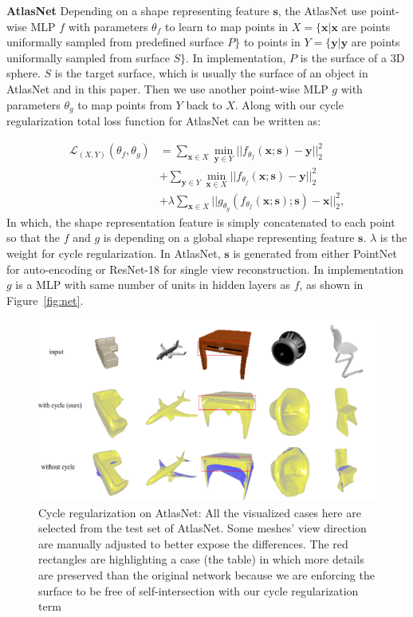 \noindent\textbf{AtlasNet} Depending on a shape representing feature $\mathbf{s}$, the AtlasNet use point-wise MLP
$f$ with parameters $\theta_f$ to learn to map points in $X=\{\mathbf{x}| \mathbf{x}$ are points uniformally sampled from predefined surface $P\}$ to points in $Y=\{\mathbf{y}| \mathbf{y}$ are points uniformally sampled from surface $S\}$. In implementation, $P$ is the surface of a 3D sphere. $S$ is the target surface, which is usually the surface of an object in AtlasNet\cite{atlasnet} and in this paper. Then we use another point-wise MLP $g$ with parameters $\theta_g$ to map points from $Y$ back to $X$. Along with our cycle regularization  total loss function for AtlasNet can be written as:

\begin{equation}
\begin{aligned}
\label{equ:atlascycle}
\mathcal{L}_{(X,Y)}(\theta_f,\theta_g) &= \sum_{\mathbf{x} \in X} \min_{\mathbf{y} \in Y}|| f_{\theta_f}(\mathbf{x};\mathbf{s}) - \mathbf{y} ||_2^2 \\ &+ \sum_{ \mathbf{y} \in Y}\min_{ \mathbf{x} \in X} || f_{\theta_f}(\mathbf{x};\mathbf{s}) - \mathbf{y} ||_2^2 \\ &+ \lambda\sum_{\mathbf{x} \in X}||g_{\theta_g}(f_{\theta_f}(\mathbf{x};\mathbf{s});\mathbf{s}) - \mathbf{x}||_2^2,
\end{aligned}
 \end{equation}
In which, the shape representation feature is simply concatenated to each point so that the $f$ and $g$ is depending on a global shape representing feature $\mathbf{s}$. $\lambda$ is the weight for cycle regularization. In AtlasNet, $\mathbf{s}$ is generated from either PointNet\cite{resnet} for auto-encoding or ResNet-18\cite{resnet} for single view reconstruction. In implementation $g$ is a MLP with same number of units in hidden layers as $f$, as shown in Figure~\ref{fig:net}.

\begin{figure}[htbp]
	\centering
	\includegraphics[width=\linewidth]{img/atlas/svr}
	\caption{Cycle regularization on AtlasNet: All the visualized cases here are selected from the test set of AtlasNet. Some meshes' view direction are manually adjusted to better expose the differences. The red rectangles are highlighting a case (the table) in which more details are preserved than the original network because we are enforcing the surface to be free of self-intersection with our cycle regularization term}
	\label{fig:svr}
\end{figure}


